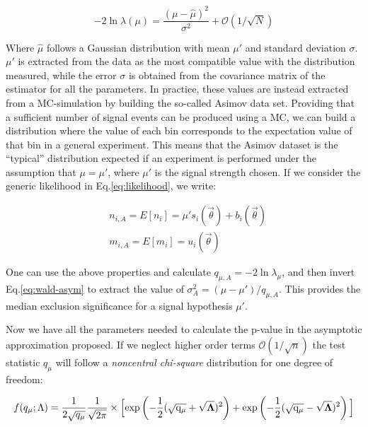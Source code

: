 \begin{equation}
  \label{eq:wald-asym}
  - 2 \ln{\lambda(\mu)} = \frac{(\mu - \hat{\mu})^2}{\sigma^2} + \mathcal{O}(1/\sqrt{N})
\end{equation}

Where $\hat{\mu}$ follows a Gaussian distribution with mean $\mu'$ and standard deviation $\sigma$. $\mu'$ is extracted from the data as the most compatible value with the distribution measured, while the error $\sigma$ is obtained from the covariance matrix of the estimator for all the parameters. In practice, these values are instead extracted from a MC-simulation by building the so-called Asimov data set. Providing that a sufficient number of signal events can be produced using a MC, we can build a distribution where the value of each bin corresponds to the expectation value of that bin in a general experiment. This means that the Asimov dataset is the ``typical'' distribution expected if an experiment is performed under the assumption that $\mu = \mu'$, where $\mu'$ is the signal strength chosen. If we consider the generic likelihood in Eq.\ref{eq:likelihood}, we write:

\begin{equation}
  \label{eq:asimov-dataset-prop}
  \begin{aligned}
    &n_{i, A} = E[n_i] = \mu' s_i (\vec{\theta}) + b_i(\vec{\theta}) \\
    &m_{i, A} = E[m_i] = u_i(\vec{\theta})
  \end{aligned}    
\end{equation}

One can use the above properties and calculate $q_{\mu, A} = - 2 \ln{\lambda_{\mu}}$, and then invert Eq.\ref{eq:wald-asym} to extract the value of $\sigma^2_{A} = (\mu - \mu')/q_{\mu,A}$. This provides the median exclusion significance for a signal hypothesis $\mu'$.

Now we have all the parameters needed to calculate the p-value in the asymptotic approximation proposed. If we neglect higher order terms $\mathcal{O}(1/\sqrt{n})$ the test statistic $q_{\mu}$ will follow a \textit{noncentral chi-square} distribution for one degree of freedom:

\begin{equation}
  \label{eq:p-value-asym}
  f(q_{\mu}; \Lambda) = \frac{1}{2\sqrt{q_{\mu}}} \frac{1}{\sqrt{2\pi}} \times \Big[ \rm{exp}\left(-\frac{1}{2} (\sqrt{q_{\mu}} + \sqrt{\boldsymbol{\Lambda}})^2 \right) + \rm{exp}\left(-\frac{1}{2} (\sqrt{q_{\mu}} - \sqrt{\boldsymbol{\Lambda}})^2 \right) \Big]
\end{equation}

